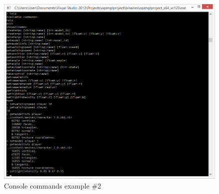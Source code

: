 \documentclass[12pt,letterpaper]{article}
\begin{document}
	\begin{figure}[h]
	\centering
	\includegraphics[width=\linewidth]{screenshot3}
	\caption{Console commands example \#2}
	\label{fig:screenshot3}
	\end{figure}
	\clearpage
	
	\nocite{*}
	
	
	
\end{document}
